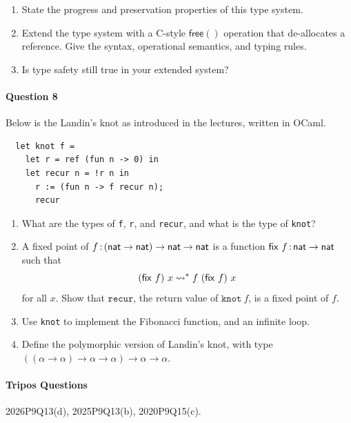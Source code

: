 \documentclass[11pt,a4paper,twoside]{article}
\begin{document}
\begin{enumerate}[label=(\alph*)]
  \item State the progress and preservation properties of this type system.

  \item Extend the type system with a C-style $\mathsf{free()}$ operation
    that de-allocates a reference.
    Give the syntax, operational semantics, and typing rules.

  \item Is type safety still true in your extended system?
\end{enumerate}

\paragraph{Question 8} Below is the Landin's knot as introduced in
the lectures, written in OCaml.
\begin{lstlisting}
  let knot f =
    let r = ref (fun n -> 0) in
    let recur n = !r n in
      r := (fun n -> f recur n);
      recur
\end{lstlisting}

\vspace{-1em}

\begin{enumerate}[label=(\alph*)]
  \item What are the types of \texttt{f}, \texttt{r}, and \texttt{recur},
    and what is the type of \texttt{knot}?

  \item A fixed point of $f \,{:}\, (\mathsf{nat} \to \mathsf{nat}) \to \mathsf{nat} \to \mathsf{nat}$
    is a function $\mathsf{fix}\ f \,{:}\, \mathsf{nat} \to \mathsf{nat}$ such that
    \[ (\mathsf{fix}\ f)\ x \reduces f\ (\mathsf{fix}\ f)\ x\]
    for all $x$.
    Show that $\texttt{recur}$, the return value of $\texttt{knot}\ f$,
    is a fixed point of $f$.

  \item Use \texttt{knot} to implement the Fibonacci function, and an
    infinite loop.

  \item Define the polymorphic version of Landin's knot, with type
    $((\alpha \to \alpha) \to \alpha \to \alpha) \to \alpha \to \alpha$.
\end{enumerate}

\paragraph{Tripos Questions} 2026P9Q13(d), 2025P9Q13(b), 2020P9Q15(c).
\end{document}

